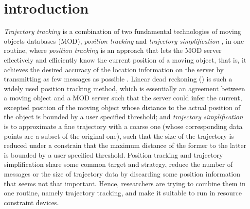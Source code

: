

\section{introduction}
\label{sec-intro}


\textit{Trajectory tracking} \cite{Lange:Tracking} is a combination of two fundamental technologies of moving objects databases (MOD), \textit{position tracking} \cite{Wolfson:PositionTracking,Leonhardi:Comparison} and \textit{trajectory simplification} \cite{Lin:Cised,Zhang:Evaluation}, in one routine, where \textit{position tracking} is an approach that lets the MOD server effectively and efficiently know the current position of a moving object, that is, it achieves the desired accuracy of the location information on the server by transmitting as few messages as possible \cite{Leonhardi:Comparison}. Linear dead reckoning (\ldr) \cite{Wolfson:PositionTracking} is such a widely used position tracking method, which is essentially an agreement between a moving object and a MOD server such that the server could infer the current, excepted position of the moving object whose distance to the actual position of the object is bounded by a user specified threshold;
%
and \textit{trajectory simplification} \cite{Lin:Cised,Zhang:Evaluation} is to approximate a fine trajectory with a coarse one (whose corresponding data points are a subset of the original one), such that the size of the trajectory is reduced under a constrain that the maximum distance of the former to the latter is bounded by a user specified threshold. 
%
Position tracking and trajectory simplification share some common target and strategy, \ie reduce the number of messages or the size of trajectory data by discarding some position information that seems not that important. Hence, researchers are trying to combine them in one routine, namely trajectory tracking, and make it suitable to run in resource constraint devices.

